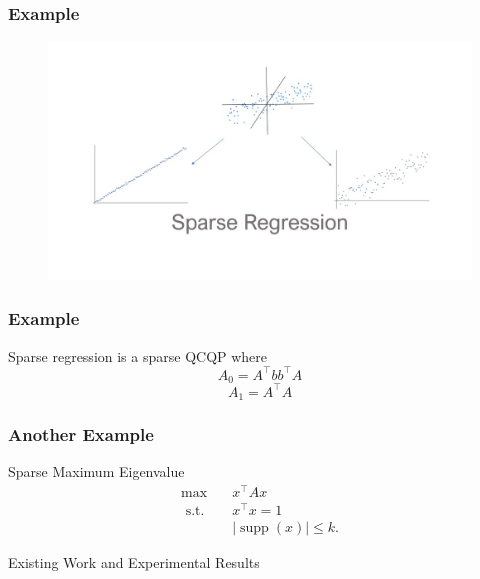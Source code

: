\documentclass{beamer}
\DeclareMathOperator*{\supp}{supp}
\newcommand{\st}{{\text{ s.t. }}}
\begin{document}
\begin{frame}
    \frametitle{Example}
    \begin{figure}[h]
        \centering
        \includegraphics[width=\linewidth]{slide3.jpg}
    \end{figure}
\end{frame}
\begin{frame}
    \frametitle{Example}
    Sparse regression is a sparse QCQP where
    \[
        A_0 = A^{\intercal}bb^{\intercal}A
    \]
    \[
        A_1 = A^{\intercal}A
    \]
\end{frame}
\begin{frame}
    \frametitle{Another Example}
    \begin{block}{Sparse Maximum Eigenvalue}
        \begin{equation*}
            \begin{aligned}
                \max\quad & x^{\intercal}Ax\\
                \st & x^{\intercal}x = 1\\
                    &|\supp(x)| \le k.
            \end{aligned}
        \end{equation*}
        
    \end{block}
\end{frame}
\begin{frame}
    \centering
    \huge
    {\color{gray}Existing Work and Experimental Results}
\end{frame}
\end{document}

